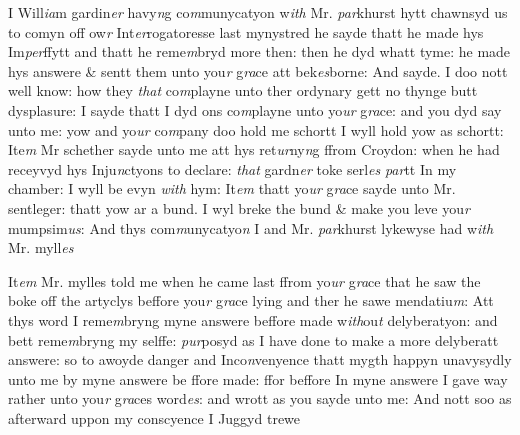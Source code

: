 \documentclass[12pt, a4paper]{book}
\begin{document}
		\ifthenelse{\isodd{\thepage}}
		{\reversemarginpar}
		{\normalmarginpar}
		I Will\textit{ia}m gardin\textit{er} havy\textit{n}g co\textit{m}munycatyon w\textit{ith} Mr. \textit{par}khurst hytt
 chawnsyd us to comyn off ow\textit{r} Int\textit{er}rogatoresse last mynystred
 he sayde thatt he made hys Im\textit{per}ffytt and thatt he reme\textit{m}bryd
 more then: then he dyd whatt tyme: he made hys answere
 \& sentt them unto you\textit{r} g\textit{ra}ce att bek\textit{es}borne: And sayde. I
 doo nott well know: how they \textit{that} co\textit{m}playne unto ther ordynary
 gett no thynge butt dysplasure: I sayde thatt I dyd ons
 co\textit{m}playne unto yo\textit{ur} g\textit{ra}ce: and you dyd say unto me: yow
 and yo\textit{ur} co\textit{m}pany doo hold me schortt I wyll hold yow
					as schortt: Ite\textit{m} Mr schether sayde unto me att hys ret\textit{ur}ny\textit{n}g
 ffrom Croydon: when he had receyvyd hys Inju\textit{n}ctyons to
 declare: \textit{that} gardn\textit{er }toke serl\textit{es}
               \textit{par}tt In my chamber: I
					wyll be evyn \textit{with} hym: It\textit{em} thatt yo\textit{ur} g\textit{ra}ce sayde unto Mr.
 sentleger: thatt yow ar a bund. I wyl breke the bund \&
 make you leve you\textit{r} mumpsim\textit{us}: And thys com\textit{m}unycatyo\textit{n}
					I and Mr. \textit{par}khurst lykewyse had w\textit{ith} Mr. myll\textit{es}
            			
			

            		
            			
		\ifthenelse{\isodd{\thepage}}
		{\reversemarginpar}
		{\normalmarginpar}
		It\textit{em} Mr. mylles told me when he came last ffrom yo\textit{ur} g\textit{ra}ce
            				that he saw the boke off the artyclys beffore you\textit{r} g\textit{ra}ce lying
 and ther he sawe mendatiu\textit{m}: Att thys word I reme\textit{m}bryng
 myne answere beffore made w\textit{ith}ou\textit{t} delyberatyon: and bett
 reme\textit{m}bryng my selffe: \textit{pur}posyd as I have done to make
 a more delyberatt answere: so to awoyde danger and
 Inco\textit{n}venyence thatt mygth happyn unavysydly unto me
 by myne answere be ffore made: ffor beffore In myne answere
 I gave way rather unto you\textit{r} g\textit{ra}ces word\textit{es}: and wrott as you
 sayde unto me: And nott
			 soo as afterward uppon my conscyence I
 Juggyd trewe
            			
            		

\dotfill
						\newpage
{}
\end{document}

